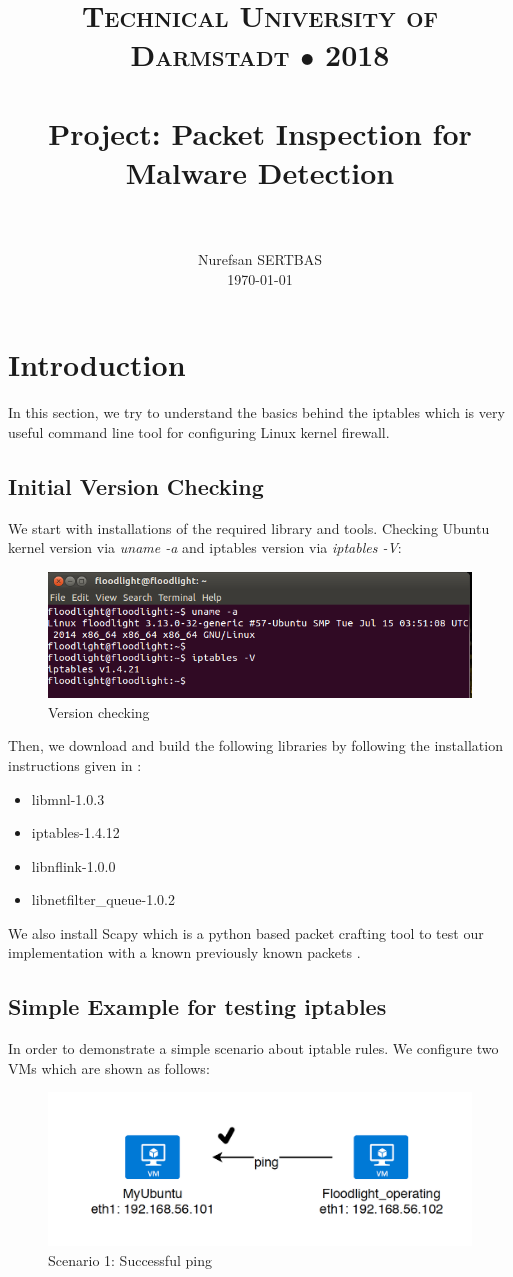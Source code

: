 \documentclass[paper=a4, fontsize=11pt]{scrartcl}
\title{
		\usefont{OT1}{bch}{b}{n}
		\normalfont \normalsize \textsc{Technical University of Darmstadt $ \bullet$ 2018} \\ [25pt]
		\horrule{0.5pt} \\[0.4cm]
		\huge Project: Packet Inspection for Malware Detection \\
		\horrule{2pt} \\[0.5cm]
}
\author{
		\normalfont 								\normalsize
        Nurefsan SERTBAS\\[-3pt]		\normalsize
        \today
}
\date{}
\numberwithin{equation}{section}		%
\numberwithin{figure}{section}			%
\numberwithin{table}{section}				%
\begin{document}
\maketitle %
\section{Introduction}
In this section, we try to understand the basics behind the iptables which is very useful command line tool for configuring Linux kernel firewall.

\subsection{Initial Version Checking}
We start with installations of the required library and tools.
Checking Ubuntu kernel version via \textit{uname -a} and iptables version via  \textit{iptables -V}:
\begin{figure}[H]
\centering
\includegraphics[width=\textwidth]{img/version.png}
\caption{Version checking}
\end{figure}

Then, we download and build the following libraries by following the installation instructions given in \cite{r2}:
\begin{itemize}
    \item libmnl-1.0.3
    \item iptables-1.4.12
    \item libnflink-1.0.0
    \item libnetfilter\_queue-1.0.2
\end{itemize}

We also install Scapy which is a python based packet crafting tool to test our implementation with a known previously known packets \cite{r3}.

\subsection{Simple Example for testing iptables}
In order to demonstrate a simple scenario about iptable rules. We configure two VMs which are shown as follows:
\begin{figure}[H]
\centering
\includegraphics[width=\textwidth]{img/9.png}
\caption{Scenario 1: Successful ping}
\end{figure}
\end{document}

